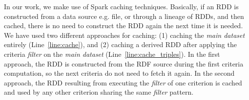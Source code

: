 In our work, we make use of Spark caching techniques. 
Basically, if an \gls{RDD} is constructed from a data source e.g. file, or through a lineage of
RDDs, and then cached, there is no need to construct the RDD again the next time it is needed.
We have used two different approaches for caching: (1) caching the \emph{main dataset} entirely (Line~\ref{line:cache}), and (2) caching a derived RDD after applying the criteria \emph{filter} on the \emph{main dataset} (Line~\ref{line:cache_triples}). 
In the first approach, the RDD is constructed from the RDF source during the first criteria computation, so the next criteria do not need to fetch it again. 
In the second approach, the RDD resulting from executing the \emph{filter} of one criterion is cached and used by any other criterion sharing the same \textit{filter} pattern. 

